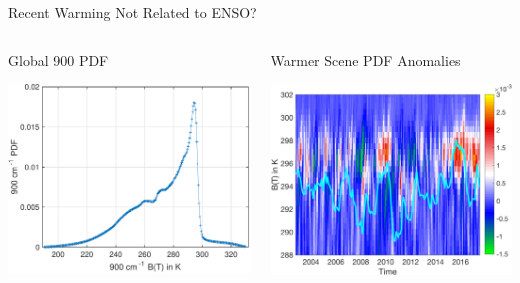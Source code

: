 \documentclass[10pt,t]{beamer}
\begin{document}
\begin{frame}{Recent Warming Not Related to ENSO?}

  \begin{columns}
    \begin{column}[T]{0.50\textwidth}
      \vspace{-0.2in}
      \begin{block}{\footnotesize Global 900 \wn PDF}
        \vspace{-0.1in}
        \begin{center}
          \includegraphics[width=0.80\linewidth]{./Figs_mei/Pdf/bt900_pdf_mean_in_time.pdf}
        \end{center}
      \end{block}
    \end{column}

    \begin{column}[T]{0.50\textwidth}
        \vspace{-0.2in}
      \begin{block}{\footnotesize Warmer Scene PDF Anomalies}
        \vspace{-0.1in}
        \begin{center}
          \includegraphics[width=0.80\linewidth]{./Figs_mei/Png/bt900_pdf_anom_highT_with_mei_index.png}
        \end{center}
      \end{block}
    \end{column}
  \end{columns}


\end{frame}
\end{document}
